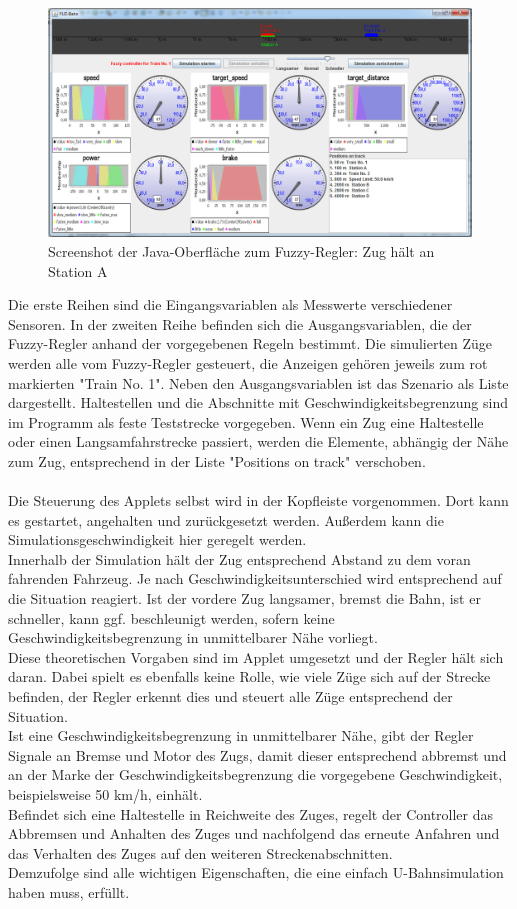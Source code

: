 \documentclass[10pt,a4paper]{article}
\begin{document}
\begin{figure}[htb]
\includegraphics[width=\textwidth]{screenshot1}
\caption[Screenshot]{Screenshot der Java-Oberfläche zum Fuzzy-Regler: Zug hält an Station A}
\label{screenshot1}
\end{figure}

Die erste Reihen sind die Eingangsvariablen als Messwerte verschiedener Sensoren.
In der zweiten Reihe befinden sich die Ausgangsvariablen, die der Fuzzy-Regler anhand der vorgegebenen Regeln bestimmt.
Die simulierten Züge werden alle vom Fuzzy-Regler gesteuert, die Anzeigen gehören jeweils zum rot markierten "Train No. 1".
Neben den Ausgangsvariablen ist das Szenario als Liste dargestellt. Haltestellen und die Abschnitte mit Geschwindigkeitsbegrenzung sind im Programm als feste Teststrecke vorgegeben.
Wenn ein Zug eine Haltestelle oder einen Langsamfahrstrecke passiert, werden die Elemente, abhängig der Nähe zum Zug, entsprechend in der Liste "Positions on track" verschoben.\\ \\
Die Steuerung des Applets selbst wird in der Kopfleiste vorgenommen. Dort kann es gestartet, angehalten und zurückgesetzt werden.
Außerdem kann die Simulationsgeschwindigkeit hier geregelt werden.\\
Innerhalb der Simulation hält der Zug entsprechend Abstand zu dem voran fahrenden Fahrzeug. Je nach Geschwindigkeitsunterschied wird entsprechend auf die Situation reagiert. Ist der vordere Zug langsamer, bremst die Bahn, ist er schneller, kann ggf. beschleunigt werden, sofern keine Geschwindigkeitsbegrenzung in unmittelbarer Nähe vorliegt. \\
Diese theoretischen Vorgaben sind im Applet umgesetzt und der Regler hält sich daran. Dabei spielt es ebenfalls keine Rolle, wie viele Züge sich auf der Strecke befinden, der Regler erkennt dies und steuert alle Züge entsprechend der Situation.\\
Ist eine Geschwindigkeitsbegrenzung in unmittelbarer Nähe, gibt der Regler Signale an Bremse und Motor des Zugs, damit dieser entsprechend abbremst und an der Marke der Geschwindigkeitsbegrenzung die vorgegebene Geschwindigkeit, beispielsweise 50 km/h, einhält.\\
Befindet sich eine Haltestelle in Reichweite des Zuges, regelt der Controller das Abbremsen und Anhalten des Zuges und nachfolgend das erneute Anfahren und das Verhalten des Zuges auf den weiteren Streckenabschnitten.\\
Demzufolge sind alle wichtigen Eigenschaften, die eine einfach U-Bahnsimulation haben muss, erfüllt.
\end{document}
